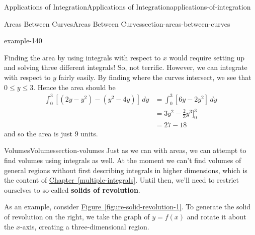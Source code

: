 \documentclass[oneside,10pt,]{book}
\newcommand{\terminology}[1]{\textbf{#1}}
\numberwithin{equation}{section}
\newcommand{\amp}{&}
\begin{document}
\begin{chapterptx}{Applications of Integration}{}{Applications of Integration}{}{}{applications-of-integration}
\begin{sectionptx}{Areas Between Curves}{}{Areas Between Curves}{}{}{section-areas-between-curves}
\begin{example}{}{example-140}
\begin{figure}
{
}
\end{figure}
\hypertarget{p-626}{}%
Finding the area by using integrals with respect to \(x\) would require setting up and solving three different integrals! So, not terrific. However, we can integrate with respect to \(y\) fairly easily. By finding where the curves intersect, we see that \(0\leq y\leq 3\). Hence the area should be%
\begin{align*}
\int_{0}^{3}[(2y - y^{2}) - (y^{2} - 4y)]\,dy \amp = \int_{0}^{3}[6y - 2y^{2}]\,dy \\
\amp = 3y^{2} - \frac{2}{3}y^{3}\Bigg]_{0}^{3} \\
\amp = 27 - 18 
\end{align*}
and so the area is just \(9\) units.%
\end{example}
\end{sectionptx}
%
%
\typeout{************************************************}
\typeout{************************************************}
%
\begin{sectionptx}{Volumes}{}{Volumes}{}{}{section-volumes}
\hypertarget{p-627}{}%
Just as we can with areas, we can attempt to find volumes using integrals as well. At the moment we can't find volumes of general regions without first describing integrals in higher dimensions, which is the content of \hyperref[multiple-integrals]{Chapter~\ref{multiple-integrals}}. Until then, we'll need to restrict ourselves to so-called \terminology{solids of revolution}.%
\par
\hypertarget{p-628}{}%
As an example, consider \hyperref[figure-solid-revolution-1]{Figure~\ref{figure-solid-revolution-1}}. To generate the solid of revolution on the right, we take the graph of \(y = f(x)\) and rotate it about the \(x\)-axis, creating a three-dimensional region.%
\begin{figure}
\centering
\leavevmode%
\begin{sidebyside}{2}{0}{0}{0}%
\begin{sbspanel}{0.5}%
\end{sbspanel}
\end{sidebyside}
\end{figure}
\end{sectionptx}
\end{chapterptx}
\end{document}
